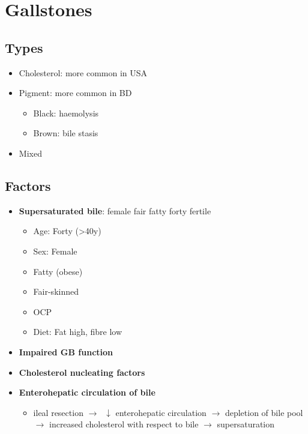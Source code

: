 \documentclass[
  12pt,
]{memoir}
\providecommand{\tightlist}{%
  \setlength{\itemsep}{0pt}\setlength{\parskip}{0pt}}
\begin{document}
\hypertarget{gallstones}{%
\section{Gallstones}\label{gallstones}}

\hypertarget{types-3}{%
\subsection{Types}\label{types-3}}

\begin{itemize}
\tightlist
\item
  Cholesterol: more common in USA
\item
  Pigment: more common in BD

  \begin{itemize}
  \tightlist
  \item
    Black: haemolysis
  \item
    Brown: bile stasis
  \end{itemize}
\item
  Mixed
\end{itemize}

\hypertarget{factors-1}{%
\subsection{Factors}\label{factors-1}}

\begin{itemize}
\tightlist
\item
  \textbf{Supersaturated bile}: female fair fatty forty fertile

  \begin{itemize}
  \tightlist
  \item
    Age: Forty (\textgreater40y)
  \item
    Sex: Female
  \item
    Fatty (obese)
  \item
    Fair-skinned
  \item
    OCP
  \item
    Diet: Fat high, fibre low
  \end{itemize}
\item
  \textbf{Impaired GB function}
\item
  \textbf{Cholesterol nucleating factors}
\item
  \textbf{Enterohepatic circulation of bile}

  \begin{itemize}
  \tightlist
  \item
    ileal resection \(\rightarrow\; \;\downarrow\) enterohepatic
    circulation \(\rightarrow\) depletion of bile pool \(\rightarrow\)
    increased cholesterol with respect to bile \(\rightarrow\)
    supersaturation
  \end{itemize}
\end{itemize}
\end{document}
